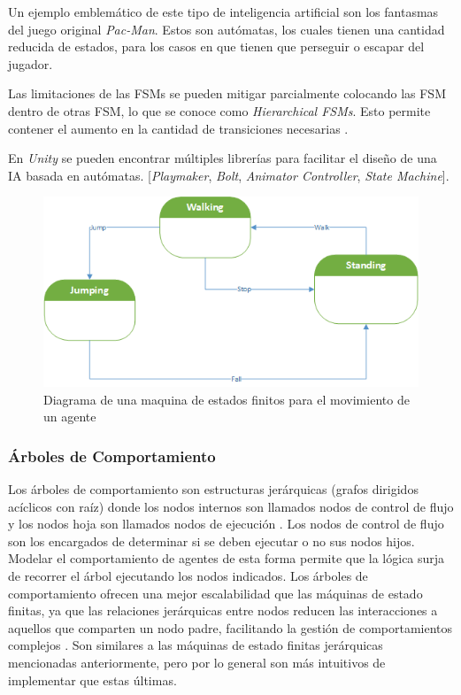 \documentclass[a4paper]{article}
\begin{document}
Un ejemplo emblemático de este tipo de inteligencia artificial son los fantasmas del juego original \textit{Pac-Man}. Estos son autómatas, los cuales tienen una cantidad reducida de estados, para los casos en que tienen que perseguir o escapar del jugador.

Las limitaciones de las FSMs se pueden mitigar parcialmente colocando las FSM dentro de otras FSM, lo que se conoce como \textit{Hierarchical FSMs}. Esto permite contener el aumento en la cantidad de transiciones necesarias \cite{finite_state_machine_in_game_development}.

En \textit{Unity} se pueden encontrar múltiples librerías para facilitar el diseño de una IA basada en autómatas. [\textit{Playmaker}, \textit{Bolt}, \textit{Animator Controller}, \textit{State Machine}].

\begin{figure}[ht]
    \centering
    \includegraphics[width=1\textwidth]{./images/finite-state-machine.png}
    \caption{Diagrama de una maquina de estados finitos para el movimiento de un agente}
    \label{fig:fsm}
\end{figure}

\subsubsection{Árboles de Comportamiento}

Los árboles de comportamiento son estructuras jerárquicas (grafos dirigidos acíclicos con raíz) donde los nodos internos son llamados nodos de control de flujo y los nodos hoja son llamados nodos de ejecución \cite{behavior_tress_in_robotics_and_ai}. Los nodos de control de flujo son los encargados de determinar si se deben ejecutar o no sus nodos hijos. Modelar el comportamiento de agentes de esta forma permite que la lógica surja de recorrer el árbol ejecutando los nodos indicados. Los árboles de comportamiento ofrecen una mejor escalabilidad que las máquinas de estado finitas, ya que las relaciones jerárquicas entre nodos reducen las interacciones a aquellos que comparten un nodo padre, facilitando la gestión de comportamientos complejos \cite{behavior_tress_in_robotics_and_ai}. Son similares a las máquinas de estado finitas jerárquicas mencionadas anteriormente, pero por lo general son más intuitivos de implementar que estas últimas.
\end{document}
